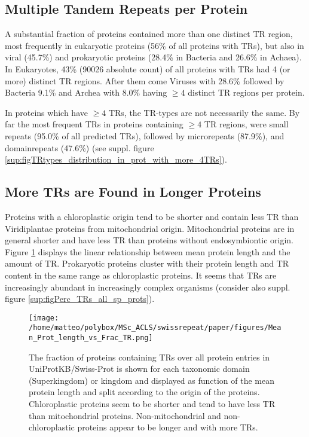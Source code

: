 \documentclass[a4,center,fleqn]{NAR}
\begin{document}
\subsection{Multiple Tandem Repeats per Protein}
A substantial fraction of proteins contained more than one distinct TR region, most frequently in eukaryotic proteins (56\% of all proteins with TRs), but also in viral (45.7\%) and prokaryotic proteins (28.4\% in Bacteria and 26.6\% in Achaea). 
In Eukaryotes, 43\% (90026 absolute count) of all proteins with TRs had 4 (or more) distinct TR regions. After them come Viruses with 28.6\% followed by Bacteria 9.1\% and Archea with 8.0\% having $\geq 4$ distinct TR regions per protein.

In proteins which have $\geq 4$ TRs, the TR-types are not necessarily the same. 
By far the most frequent TRs in proteins containing $\geq 4$ TR regions, were small repeats (95.0\% of all predicted TRs), followed by microrepeats (87.9\%), and domainrepeats (47.6\%) (see suppl. figure \ref{sup:figTRtypes_distribution_in_prot_with_more_4TRs}).

\subsection{More TRs are Found in Longer Proteins}
Proteins with a chloroplastic origin tend to be shorter and contain less TR than Viridiplantae proteins from mitochondrial origin. Mitochondrial proteins are in general shorter and have less TR than proteins without endosymbiontic origin.
Figure \ref{figPerc_TRs_all_sp_prots} displays the linear relationship between mean protein length and the amount of TR. Prokaryotic proteins cluster with their protein length and TR content in the same range as chloroplastic proteins. 
It seems that TRs are increasingly abundant in increasingly complex organisms (consider also suppl. figure \ref{sup:figPerc_TRs_all_sp_prots}). 


\begin{figure}[t]
\begin{center}
\texttt{[image: /home/matteo/polybox/MSc\_ACLS/swissrepeat/paper/figures/Mean\_Prot\_length\_vs\_Frac\_TR.png]}
\end{center}
\caption{The fraction of proteins containing TRs over all protein entries in UniProtKB/Swiss-Prot is shown for each taxonomic domain (Superkingdom) or kingdom and displayed as function of the mean protein length and split according to the origin of the proteins.
Chloroplastic proteins seem to be shorter and tend to have less TR than mitochondrial proteins. Non-mitochondrial and non-chloroplastic proteins appear to be longer and with more TRs.
}
\label{figPerc_TRs_all_sp_prots}
\end{figure}
\end{document}
